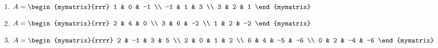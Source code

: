 \begin{enumialphparenastyle}
\begin{ex}
\begin{enumerate}
\item
$A = \begin{mymatrix}{rrr}
1 & 0 & -1 \\
-1 & 1 & 3 \\
3 & 2 & 1 
\end{mymatrix}$

\item 
$A = \begin{mymatrix}{rrr}
2 & 4 & 0 \\
3 & 6 & -2 \\
1 & 2 & -2
\end{mymatrix}$ 

\item 
$ A = \begin{mymatrix}{rrrr}
2 & -1 & 3 & 5 \\
2 & 0 & 1 & 2 \\
6 & 4 & -5 & -6 \\
0 & 2 & -4 & -6 
\end{mymatrix}$

\end{enumerate}
\end{ex}

\end{enumialphparenastyle}
